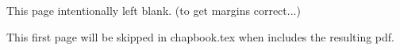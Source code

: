 \documentclass[10pt,twoside,openany,article]{memoir}
\begin{document}
This page intentionally left blank. (to get margins correct...)

This first page will be skipped in chapbook.tex when includes the resulting pdf.
\clearpage
\setcounter{page}{1}

\end{document}
